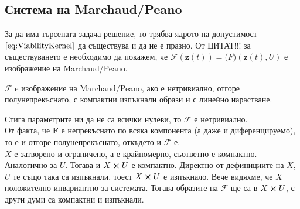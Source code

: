 \subsection{Система на Marchaud/Peano}
За да има търсената задача решение, то трябва ядрото на допустимост $\eqref{eq:ViabilityKernel}$ да съществува и да не е празно. От \color{Red} ЦИТАТ!!!
\color{Black} за съществуването е необходимо да покажем, че $\mathscr{F}(\mathbf{z}(t))=\mathbf(F)(\mathbf{z}(t), U)$ е изображение на Marchaud/Peano.

$\mathscr{F}$ e изображение на Marchaud/Peano, ако е нетривиално, отгоре полунепрекъснато, с компактни изпъкнали образи и с линейно нарастване.

Стига параметрите ни да не са всички нулеви, то $\mathscr{F}$ е нетривиално. \\
От факта, че $\mathbf{F}$ е непрекъснато по всяка компонента (а даже и диференцируемо), то е и отгоре полунепрекъснато, откъдето и $\mathscr{F}$ е. \\
$X$ е затворено и ограничено, а е крайномерно, съответно е компактно. Аналогично за $U$. Тогава и $X \cross U$ е компактно. Директно от дефинициите на $X$, $U$ те също така са изпъкнали, тоест $X \cross U$ е изпъкнало. Вече видяхме, че $X$ положително инвариантно за системата. Тогава образите на $\mathscr{F}$ ще са в $X \cross U$, с други думи са компактни и изпъкнали. \\

